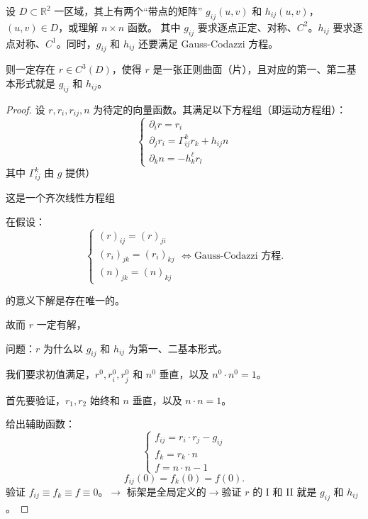 \documentclass[lang=cn,10pt,thmcnt=section]{elegantbook}
\begin{document}
\begin{theorem}[存在性定理]
    设 $D \subset \mathbb{R}^2$ 一区域，其上有两个“带点的矩阵” $g_{ij}(u,v)$ 和 $h_{ij}(u,v)$，$(u,v) \in D$，或理解 $n \times n$ 函数。
其中 $g_{ij}$ 要求逐点正定、对称、$C^2$。$h_{ij}$ 要求逐点对称、$C^1$。同时，$g_{ij}$ 和 $h_{ij}$ 还要满足 Gauss-Codazzi 方程。

则一定存在 $r \in C^3(D)$，使得 $r$ 是一张正则曲面（片），且对应的第一、第二基本形式就是 $g_{ij}$ 和 $h_{ij}$。
\end{theorem}
\begin{proof}
    设 $r, r_i, r_{ij}, n$ 为待定的向量函数。其满足以下方程组（即运动方程组）：
\[
\begin{cases}
\partial_i r = r_i \\
\partial_j r_i = \Gamma_{ij}^k r_k + h_{ij} n \\
\partial_k n = -h_k^\ell r_l
\end{cases}
\]
其中 $\Gamma_{ij}^k$ 由 $g$ 提供）

这是一个齐次线性方程组

在假设：
\[
\begin{cases}
(r)_{ij} = (r)_{ji} \\
(r_i)_{jk} = (r_i)_{kj} \\
(n)_{jk} = (n)_{kj}
\end{cases}
\Leftrightarrow \text{Gauss-Codazzi 方程}.
\]

的意义下解是存在唯一的。

故而 $r$ 一定有解，

问题：$r$ 为什么以 $g_{ij}$ 和 $h_{ij}$ 为第一、二基本形式。

我们要求初值满足，$r^0, r_i^0, r_j^0$ 和 $n^0$ 垂直，以及 $n^0 \cdot n^0 = 1$。

首先要验证，$r_1, r_2$ 始终和 $n$ 垂直，以及 $n \cdot n = 1$。

给出辅助函数：
\[
\begin{cases}
f_{ij} = r_i \cdot r_j - g_{ij} \\
f_k = r_k \cdot n \\
f = n \cdot n - 1
\end{cases}
\]
\[
f_{ij}(0) = f_k(0) = f(0).
\]
验证 $f_{ij} \equiv f_k \equiv f \equiv 0$。$\rightarrow$ 标架是全局定义的$\rightarrow$验证 $r$ 的 I 和 II 就是 $g_{ij}$ 和 $h_{ij}$。


\end{proof}
\end{document}
